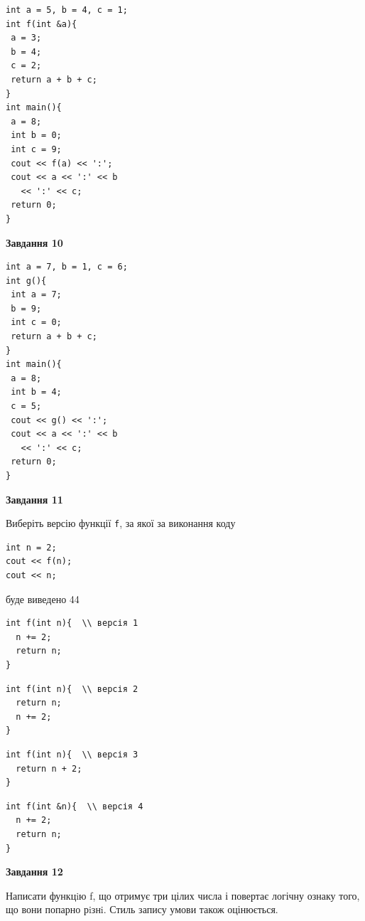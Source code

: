 \documentclass[12pt, ukrainian]{article}
\def\code#1{\Verb!#1!}
\begin{document}
{\begin {large}
\begin{minipage}[t]{7.0cm}
\begin{verbatim}
int a = 5, b = 4, c = 1;
int f(int &a){
 a = 3;
 b = 4;
 c = 2;
 return a + b + c;
}
int main(){
 a = 8;
 int b = 0;
 int c = 9;
 cout << f(a) << ':';
 cout << a << ':' << b 
   << ':' << c;
 return 0;
}
\end{verbatim}



\begin{center}
\textbf{Завдання 10}
\end{center}
\vspace{-8mm}

\begin{verbatim}
int a = 7, b = 1, c = 6;
int g(){
 int a = 7;
 b = 9;
 int c = 0;
 return a + b + c;
}
int main(){
 a = 8;
 int b = 4;
 c = 5;
 cout << g() << ':';
 cout << a << ':' << b 
   << ':' << c;
 return 0;
}
\end{verbatim}

\end{minipage}
\vline \hspace{1mm}
\begin{minipage}[t]{11.0cm}

\begin{center}
\textbf{Завдання 11}
\end{center}
Виберіть версію функції \code{f}, за якої за виконання коду
\begin{verbatim}
int n = 2;
cout << f(n);
cout << n;
\end{verbatim}

буде виведено 44

\begin{verbatim}
int f(int n){  \\ версія 1
  n += 2;
  return n;
}
\end{verbatim}

\vspace{-8mm}\begin{verbatim}
int f(int n){  \\ версія 2
  return n;
  n += 2;
}
\end{verbatim}

\vspace{-8mm}\begin{verbatim}
int f(int n){  \\ версія 3
  return n + 2;
}
\end{verbatim}

\vspace{-8mm}\begin{verbatim}
int f(int &n){  \\ версія 4
  n += 2;
  return n;
}
\end{verbatim}



\begin{center}
\textbf{Завдання 12}
\end{center}

Написати функцiю f, що отримує три цілих числа і повертає логічну ознаку того, що вони попарно рiзнi. Стиль запису умови також оцінюється.\par

\end{minipage}

\end {large}}
\end{document}
